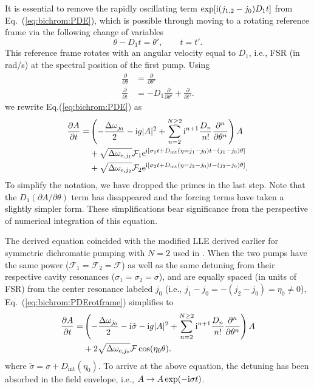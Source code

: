 It is essential to remove the rapidly oscillating term $\exp[\mathrm{i}(j_{1,2}-j_0)D_1 t]$ from Eq.~(\ref{eq:bichrom:PDE}), which is possible through moving to a rotating reference frame via the following change of variables
%
\begin{equation}\label{eq:bichrom:rotframe}
\theta - D_1 t = \theta', \qquad t = t'.
\end{equation}
%
This reference frame rotates with an angular velocity equal to $D_1$, i.e., FSR (in rad/s) at the spectral position of the first pump. Using
\begin{align}
\frac{\partial}{\partial\theta} &= \frac{\partial}{\partial \theta'} \\
\frac{\partial}{\partial t} &= -D_1 \frac{\partial}{\partial \theta'} + \frac{\partial}{\partial t'}.
\end{align}
%
we rewrite Eq.(\ref{eq:bichrom:PDE}) as
%
\begin{align} \label{eq:bichrom:PDErotframe}
\frac{\partial A}{\partial t} = & \left( -\frac{\Delta \omega_{j_0}}{2} -\mathrm{i} g |A|^2 + \sum_{n=2}^{N \ge 2} \mathrm{i}^{n+1} \frac{D_n}{n!}\frac{\partial^n}{\partial\theta^n} \right) A \nonumber \\
& + \sqrt{\Delta\omega_{\mathrm{e},j_1}} \mathcal{F}_1 \mathrm{e}^{ \mathrm{i} \left[ \sigma_1 t + D_{\mathrm{int}}(\eta = j_1-j_0) t - (j_1-j_0) \theta \right] } \nonumber \\
& + \sqrt{\Delta\omega_{\mathrm{e},j_2}} \mathcal{F}_2 \mathrm{e}^{ \mathrm{i} \left[ \sigma_2 t + D_{\mathrm{int}}(\eta = j_2-j_0) t - (j_2-j_0) \theta \right] }.
\end{align}
%
To simplify the notation, we have dropped the primes in the last step. Note that the $D_1 (\partial A/\partial\theta)$ term has disappeared and the forcing terms have taken a slightly simpler form. These simplifications bear significance from the perspective of numerical integration of this equation.

The derived equation coincided with the modified LLE derived earlier for symmetric dichromatic pumping with $N=2$ used in \cite{hansson2014bichromatically}. When the two pumps have the same power ($\mathcal{F}_1 = \mathcal{F}_2 = \mathcal{F}$) as well as the same detuning from their respective cavity resonances ($\sigma_1 = \sigma_2 = \sigma$), and are equally spaced (in units of FSR) from the center resonance labeled $j_0$ (i.e., $j_1 - j_0 = -(j_2 - j_0) = \eta_0 \neq 0$), Eq.~(\ref{eq:bichrom:PDErotframe}) simplifies to
%
\begin{align}
\frac{\partial A}{\partial t} = & \left( -\frac{\Delta \omega_{j_0}}{2} -\mathrm{i} \tilde{\sigma} -\mathrm{i} g |A|^2 + \sum_{n=2}^{N \ge 2} \mathrm{i}^{n+1} \frac{D_n}{n!}\frac{\partial^n}{\partial\theta^n} \right) A \nonumber \\
& + 2 \sqrt{\Delta\omega_{\mathrm{e},j_0}} \mathcal{F} \cos(\eta_0 \theta).
\end{align}
%
where $\tilde{\sigma} = \sigma + D_{\mathrm{int}}(\eta_0)$. To arrive at the above equation, the detuning has been absorbed in the field envelope, i.e., $A \to A \exp(-\mathrm{i} \sigma t)$.

